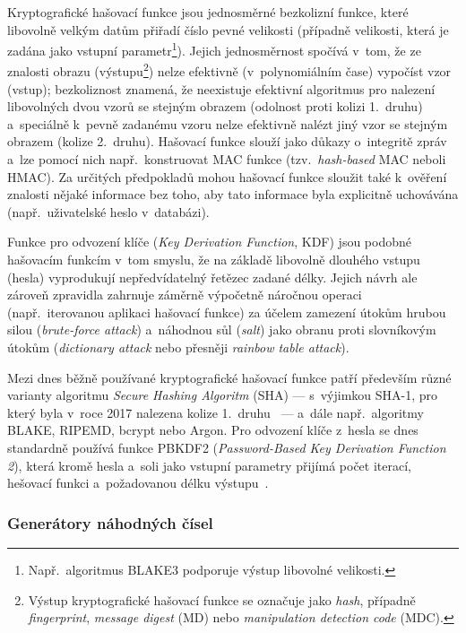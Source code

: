 Kryptografické hašovací funkce jsou jednosměrné bezkolizní funkce, které libovolně velkým datům přiřadí číslo pevné velikosti (případně velikosti, která je zadána jako vstupní parametr\footnote{Např.\ algoritmus BLAKE3 podporuje výstup libovolné velikosti.}). Jejich jednosměrnost spočívá v~tom, že ze znalosti obrazu (výstupu\footnote{Výstup kryptografické hašovací funkce se označuje jako \emph{hash}, případně \emph{fingerprint}, \emph{message digest} (MD) nebo \emph{manipulation detection code} (MDC).}) nelze efektivně (v~polynomiálním čase) vypočíst vzor (vstup); bezkoliznost znamená, že neexistuje efektivní algoritmus pro nalezení libovolných dvou vzorů se stejným obrazem (odolnost proti kolizi 1.~druhu) a~speciálně k~pevně zadanému vzoru nelze efektivně nalézt jiný vzor se stejným obrazem (kolize 2.~druhu). Hašovací funkce slouží jako důkazy o~integritě zpráv a~lze pomocí nich např.\ konstruovat MAC funkce (tzv.~\textit{hash-based} MAC neboli HMAC). Za určitých předpokladů mohou hašovací funkce sloužit také k~ověření znalosti nějaké informace bez toho, aby tato informace byla explicitně uchovávána (např.\ uživatelské heslo v~databázi).

Funkce pro odvození klíče (\textit{Key Derivation Function}, KDF) jsou podobné hašovacím funkcím v~tom smyslu, že na základě libovolně dlouhého vstupu (hesla) vyprodukují nepředvídatelný řetězec zadané délky. Jejich návrh ale zároveň zpravidla zahrnuje záměrně výpočetně náročnou operaci (např.\ iterovanou aplikaci hašovací funkce) za účelem zamezení útokům hrubou silou (\textit{brute-force attack}) a~náhodnou sůl (\textit{salt}) jako obranu proti slovníkovým útokům (\textit{dictionary attack} nebo přesněji \textit{rainbow table attack}).

Mezi dnes běžně používané kryptografické hašovací funkce patří především různé varianty algoritmu \emph{Secure Hashing Algoritm} (SHA) --- s~výjimkou SHA-1, pro který byla v~roce 2017 nalezena kolize 1.~druhu~\cite{shattered} --- a~dále např.\ algoritmy BLAKE, RIPEMD, bcrypt nebo Argon. Pro odvození klíče z~hesla se dnes standardně používá funkce PBKDF2 (\textit{Password-Based Key Derivation Function 2}), která kromě hesla a~soli jako vstupní parametry přijímá počet iterací, hešovací funkci a~požadovanou délku výstupu~\cite{rfc2898}. 

\subsubsection*{Generátory náhodných čísel}

